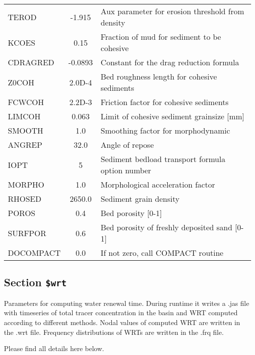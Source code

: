 \begin{table}[ht]
\begin{tabular}{lcl}
TEROD   & -1.915 & Aux parameter for erosion threshold from density \\
KCOES   & 0.15 & Fraction of mud for sediment to be cohesive \\
CDRAGRED& -0.0893 & Constant for the drag reduction formula \\
Z0COH   & 2.0D-4 & Bed roughness length for cohesive sediments \\
FCWCOH  & 2.2D-3 & Friction factor for cohesive sediments \\
LIMCOH  & 0.063 & Limit of cohesive sediment grainsize [mm] \\
SMOOTH  & 1.0 & Smoothing factor for morphodynamic \\
ANGREP  & 32.0 & Angle of repose \\
IOPT    & 5 & Sediment bedload transport formula option number \\
MORPHO  & 1.0 & Morphological acceleration factor \\
RHOSED  & 2650.0 & Sediment grain density \\
POROS   & 0.4 & Bed porosity [0-1] \\
SURFPOR & 0.6 & Bed porosity of freshly deposited sand [0-1] \\
DOCOMPACT& 0.0 & If not zero, call COMPACT routine \\ \hline
\end{tabular}
\label{tab:table_sedcon}
\end{table}

\subsection{Section {\tt \$wrt}}


Parameters for computing water renewal time.
During runtime it writes a .jas file with timeseries of total tracer
concentration in the basin and WRT computed according to different methods.
Nodal values of computed WRT are written in the .wrt file.
Frequency distributions of WRTs are written in the .frq file.

Please find all details here below.

\par

\par

